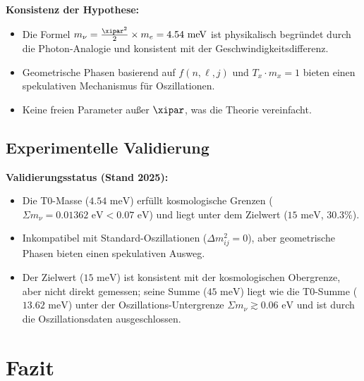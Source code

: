 	\begin{important}
		\textbf{Konsistenz der Hypothese:}
		\begin{itemize}
			\item Die Formel \(m_\nu = \frac{\xipar^2}{2} \times m_e = 4.54 \text{ meV}\) ist physikalisch begründet durch die Photon-Analogie und konsistent mit der Geschwindigkeitsdifferenz.
			\item Geometrische Phasen basierend auf \(f(n, \ell, j)\) und \(T_x \cdot m_x = 1\) bieten einen spekulativen Mechanismus für Oszillationen.
			\item Keine freien Parameter außer \(\xipar\), was die Theorie vereinfacht.
		\end{itemize}
	\end{important}
	
	\subsection{Experimentelle Validierung}
	
	\begin{experimental}
		\textbf{Validierungsstatus (Stand 2025):}
		\begin{itemize}
			\item Die T0-Masse (\(4.54 \text{ meV}\)) erfüllt kosmologische Grenzen (\(\Sigma m_\nu = 0.01362 \text{ eV} < 0.07 \text{ eV}\)) und liegt unter dem Zielwert (\(15 \text{ meV}\), \(30.3\%\)).
			\item Inkompatibel mit Standard-Oszillationen (\(\Delta m^2_{ij} = 0\)), aber geometrische Phasen bieten einen spekulativen Ausweg.
			\item Der Zielwert (\(15 \text{ meV}\)) ist konsistent mit der kosmologischen Obergrenze, aber nicht direkt gemessen; seine Summe (\(45 \text{ meV}\)) liegt wie die T0-Summe (\(13.62 \text{ meV}\)) unter der Oszillations-Untergrenze \(\Sigma m_\nu \gtrsim 0.06 \text{ eV}\) und ist durch die Oszillationsdaten ausgeschlossen.
		\end{itemize}
	\end{experimental}
	
	\section{Fazit}
	
